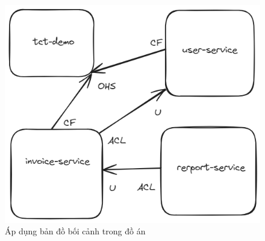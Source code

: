 \begin{figure}[H]

\centering

\includegraphics[scale = 0.4]{pictures/_ap_dung_ban_do_boi_canh/freelancer.main.excalidraw.png}

\caption{Áp dụng bản đồ bối cảnh trong đồ án}

\end{figure}